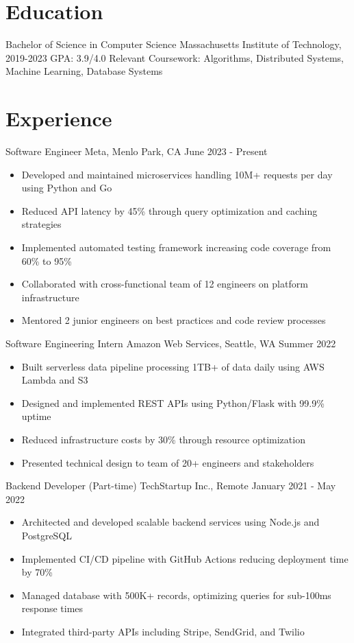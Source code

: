\documentclass{article}
\begin{document}

\section{Education}
Bachelor of Science in Computer Science
Massachusetts Institute of Technology, 2019-2023
GPA: 3.9/4.0
Relevant Coursework: Algorithms, Distributed Systems, Machine Learning, Database Systems

\section{Experience}

Software Engineer
Meta, Menlo Park, CA
June 2023 - Present
\begin{itemize}
\item Developed and maintained microservices handling 10M+ requests per day using Python and Go
\item Reduced API latency by 45\% through query optimization and caching strategies
\item Implemented automated testing framework increasing code coverage from 60\% to 95\%
\item Collaborated with cross-functional team of 12 engineers on platform infrastructure
\item Mentored 2 junior engineers on best practices and code review processes
\end{itemize}

Software Engineering Intern
Amazon Web Services, Seattle, WA
Summer 2022
\begin{itemize}
\item Built serverless data pipeline processing 1TB+ of data daily using AWS Lambda and S3
\item Designed and implemented REST APIs using Python/Flask with 99.9\% uptime
\item Reduced infrastructure costs by 30\% through resource optimization
\item Presented technical design to team of 20+ engineers and stakeholders
\end{itemize}

Backend Developer (Part-time)
TechStartup Inc., Remote
January 2021 - May 2022
\begin{itemize}
\item Architected and developed scalable backend services using Node.js and PostgreSQL
\item Implemented CI/CD pipeline with GitHub Actions reducing deployment time by 70\%
\item Managed database with 500K+ records, optimizing queries for sub-100ms response times
\item Integrated third-party APIs including Stripe, SendGrid, and Twilio
\end{itemize}
\end{document}
